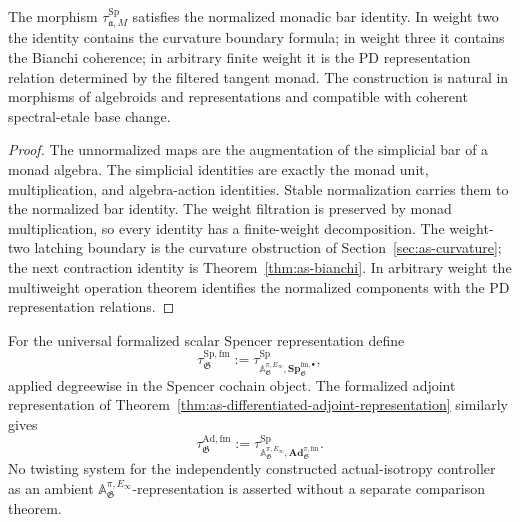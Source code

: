 \begin{theorem}
\label{thm:as-twisting-identity}
The morphism
$\tau_{\mathfrak a,M}^{\mathrm{Sp}}$ satisfies the normalized monadic bar
identity.  In weight two the identity contains the curvature boundary
formula; in weight three it contains the Bianchi coherence; in arbitrary
finite weight it is the PD representation relation determined by the
filtered tangent monad.  The construction is natural in morphisms of
algebroids and representations and compatible with coherent spectral-etale
base change.
\end{theorem}

\begin{proof}
The unnormalized maps are the augmentation of the simplicial bar of a monad
algebra.  The simplicial identities are exactly the monad unit,
multiplication, and algebra-action identities.  Stable normalization carries
them to the normalized bar identity.  The weight filtration is preserved by
monad multiplication, so every identity has a finite-weight decomposition.
The weight-two latching boundary is the curvature obstruction of
Section~\ref{sec:as-curvature}; the next contraction identity is
Theorem~\ref{thm:as-bianchi}.  In arbitrary weight the multiweight operation
theorem identifies the normalized components with the PD representation
relations.
\end{proof}

\begin{definition}
\label{def:as-twisting}
For the universal formalized scalar Spencer representation define
\[
\boxed{
    \tau_{\mathfrak G}^{\mathrm{Sp,fm}}
    :=
    \tau_{
        \mathbb A_{\mathfrak G}^{\pi,E_\infty},
        \mathbf{Sp}_{\mathfrak G}^{\mathrm{fm},\bullet}
    }^{\mathrm{Sp}},
}
\]
applied degreewise in the Spencer cochain object.  The formalized adjoint
representation of
Theorem~\ref{thm:as-differentiated-adjoint-representation} similarly gives
\[
\boxed{
    \tau_{\mathfrak G}^{\mathrm{Ad,fm}}
    :=
    \tau_{
        \mathbb A_{\mathfrak G}^{\pi,E_\infty},
        \mathbf{Ad}_{\mathfrak G}^{\pi,\mathrm{fm}}
    }^{\mathrm{Sp}}.
}
\]
No twisting system for the independently constructed actual-isotropy
controller as an ambient
$\mathbb A_{\mathfrak G}^{\pi,E_\infty}$-representation is asserted without
a separate comparison theorem.
\end{definition}

